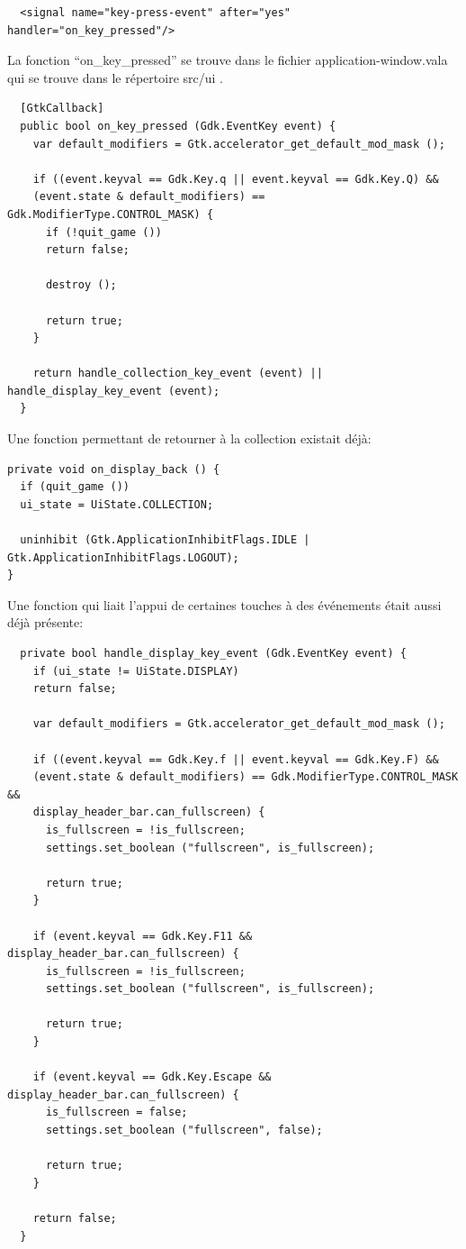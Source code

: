\documentclass[12pt]{report}
\begin{document}
\begin{verbatim}
  <signal name="key-press-event" after="yes" handler="on_key_pressed"/>
\end{verbatim}

La fonction ``on\_key\_pressed'' se trouve dans le fichier
application-window.vala qui se trouve dans le répertoire src/ui .

\begin{verbatim}
  [GtkCallback]
  public bool on_key_pressed (Gdk.EventKey event) {
    var default_modifiers = Gtk.accelerator_get_default_mod_mask ();

    if ((event.keyval == Gdk.Key.q || event.keyval == Gdk.Key.Q) &&
    (event.state & default_modifiers) == Gdk.ModifierType.CONTROL_MASK) {
      if (!quit_game ())
      return false;

      destroy ();

      return true;
    }

    return handle_collection_key_event (event) || handle_display_key_event (event);
  }
\end{verbatim}

Une fonction permettant de retourner à la collection existait déjà:

\begin{verbatim}
private void on_display_back () {
  if (quit_game ())
  ui_state = UiState.COLLECTION;

  uninhibit (Gtk.ApplicationInhibitFlags.IDLE | Gtk.ApplicationInhibitFlags.LOGOUT);
}
\end{verbatim}

Une fonction qui liait l'appui de certaines touches à des événements
était aussi déjà présente:

\begin{verbatim}
  private bool handle_display_key_event (Gdk.EventKey event) {
    if (ui_state != UiState.DISPLAY)
    return false;

    var default_modifiers = Gtk.accelerator_get_default_mod_mask ();

    if ((event.keyval == Gdk.Key.f || event.keyval == Gdk.Key.F) &&
    (event.state & default_modifiers) == Gdk.ModifierType.CONTROL_MASK &&
    display_header_bar.can_fullscreen) {
      is_fullscreen = !is_fullscreen;
      settings.set_boolean ("fullscreen", is_fullscreen);

      return true;
    }

    if (event.keyval == Gdk.Key.F11 && display_header_bar.can_fullscreen) {
      is_fullscreen = !is_fullscreen;
      settings.set_boolean ("fullscreen", is_fullscreen);

      return true;
    }

    if (event.keyval == Gdk.Key.Escape && display_header_bar.can_fullscreen) {
      is_fullscreen = false;
      settings.set_boolean ("fullscreen", false);

      return true;
    }
    
    return false;
  }
\end{verbatim}
\end{document}
